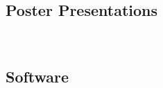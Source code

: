 \documentclass[10pt, letterpaper]{article}
\newcommand{\TablePad}{\vspace{-0.4cm}}
\begin{document}
\subsection{Poster Presentations}
\TablePad
\begin{refsection}

  ~\nocite{*}
  \printbibliography[heading=none, keyword={Poster-Presentation}]


\end{refsection}

\subsection{Software}
\TablePad
\begin{refsection}



  

\end{refsection}



\end{document}

